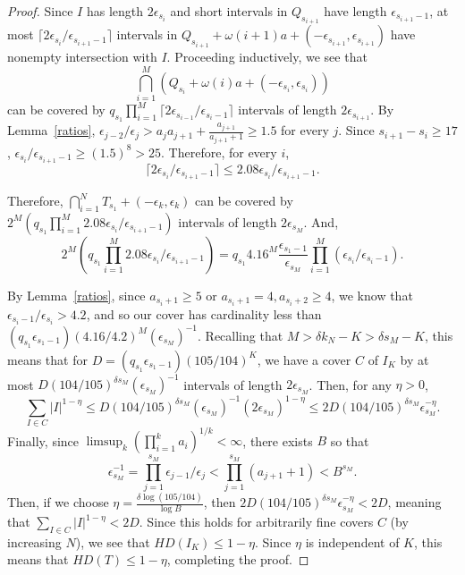 \documentclass[11pt,reqno]{amsart}
\theoremstyle{definition}
\theoremstyle{plain}
\begin{document}
\begin{proof}
Since $I$ has length $2\epsilon_{s_i}$ and short intervals in $Q_{s_{i+1}}$ have length $\epsilon_{s_{i+1}-1}$, 
at most $\lceil 2\epsilon_{s_i}/\epsilon_{s_{i+1}-1} \rceil$ intervals in $Q_{s_{i+1}} + \omega(i+1) a + 
(-\epsilon_{s_{i+1}}, \epsilon_{s_{i+1}})$ have nonempty intersection with $I$. Proceeding inductively, we see that 
\[
\bigcap_{i = 1}^{M} (Q_{s_i} + \omega(i) a + (-\epsilon_{s_i}, \epsilon_{s_i}))
\]
can be covered by $q_{s_1} \prod_{i=1}^{M} \lceil 2\epsilon_{s_{i-1}}/\epsilon_{s_i-1} \rceil$ intervals of length $2\epsilon_{s_{i+1}}$. By Lemma~\ref{ratios}, $\epsilon_{j-2}/\epsilon_j > a_j a_{j+1} + \frac{a_{j+1}}{a_{j+1} + 1} \geq 1.5$ for every $j$. Since 
$s_{i+1} - s_i \geq 17$, $\epsilon_{s_i}/\epsilon_{s_{i+1}-1} \geq (1.5)^8 > 25$. Therefore, for every $i$,
\[
\lceil 2\epsilon_{s_i}/\epsilon_{s_{i+1}-1} \rceil \leq 2.08 \epsilon_{s_i}/\epsilon_{s_{i+1}-1}.
\]

Therefore,
$\bigcap_{i=1}^{N} T_{s_1} + (-\epsilon_k, \epsilon_k)$ can be covered by
$2^M \left(q_{s_1} \prod_{i=1}^M 2.08 \epsilon_{s_i}/\epsilon_{s_{i+1}-1}\right)$ intervals of length $2\epsilon_{s_M}$. And,
\[
2^M \left(q_{s_1} \prod_{i=1}^M 2.08 \epsilon_{s_i}/\epsilon_{s_{i+1}-1}\right) = 
q_{s_1} 4.16^M \frac{\epsilon_{s_1-1}}{\epsilon_{s_M}} \prod_{i = 1}^M (\epsilon_{s_i}/\epsilon_{s_i-1}).
\]

By Lemma~\ref{ratios}, since $a_{s_i+1} \geq 5$ or $a_{s_i+1} = 4, a_{s_i+2} \geq 4$, we know that $\epsilon_{s_i-1}/\epsilon_{s_i} > 4.2$, and so our cover has cardinality less than $(q_{s_1} \epsilon_{s_1 - 1}) (4.16/4.2)^M (\epsilon_{s_M})^{-1}$. Recalling that $M > \delta k_N - K > \delta s_M - K$, this means that for $D = (q_{s_1} \epsilon_{s_1 - 1}) (105/104)^K$, we have a cover $C$ of $I_K$ by at most 
$D (104/105)^{\delta s_M} (\epsilon_{s_M})^{-1}$ intervals of length $2\epsilon_{s_M}$. Then, for any $\eta > 0$,
\[
\sum_{I \in C} |I|^{1-\eta} \leq 
D (104/105)^{\delta s_M} (\epsilon_{s_M})^{-1} (2\epsilon_{s_M})^{1-\eta} \leq 2D (104/105)^{\delta s_M} \epsilon_{s_M}^{-\eta}.
\]
Finally, since $\limsup_k \left(\prod_{i=1}^k a_i\right)^{1/k} < \infty$, there exists $B$ so that 
\[
\epsilon_{s_M}^{-1} = \prod_{j = 1}^{s_M} \epsilon_{j-1}/\epsilon_j < \prod_{j=1}^{s_M} (a_{j+1} + 1) < B^{s_M}.
\]
Then, if we choose $\eta =  \frac{\delta \log (105/104)}{\log B}$, then 
$2D (104/105)^{\delta s_M} \epsilon_{s_M}^{-\eta} < 2D$, meaning that $\sum_{I \in C} |I|^{1-\eta} < 2D$. Since this holds for arbitrarily fine covers $C$ (by increasing $N$), we see that $HD(I_K) \leq 1 - \eta$. Since $\eta$ is independent of $K$, this means that $HD(T) \leq 1- \eta$, completing the proof.

\end{proof}
\end{document}
